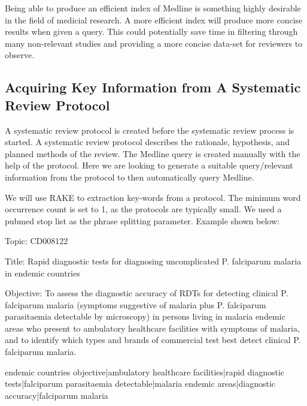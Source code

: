 Being able to produce an efficient index of Medline is something highly desirable in the field of medicial research. A more efficient index will produce more concise results when given a query. This could potentially save time in filtering through many non-relevant studies and providing a more concise data-set for reviewers to observe. 

\subsection{Acquiring Key Information from A Systematic Review Protocol}

A systematic review protocol is created before the systematic review process is started. A systematic review protocol describes the rationale, hypothesis, and planned methods of the review. The Medline query is created manually with the help of the protocol. Here we are looking to generate a suitable query/relevant information from the protocol to then automatically query Medline.

We will use RAKE \cite{rake} to extraction key-words from a protocol. The minimum word occurrence count is set to 1, as the protocols are typically small. We used a pubmed stop list as the phrase splitting parameter. Example shown below:

\begin{tcolorbox}

Topic: CD008122 

Title: Rapid diagnostic tests for diagnosing uncomplicated P. falciparum malaria in endemic countries 

Objective: To assess the diagnostic accuracy of RDTs for detecting clinical P. falciparum malaria (symptoms suggestive of malaria plus P. falciparum parasitaemia detectable by microscopy) in persons living in malaria endemic areas who present to ambulatory healthcare facilities with symptoms of malaria, and to identify which types and brands of commercial test best detect clinical P. falciparum malaria.

\end{tcolorbox}

 
\begin{tcolorbox}

endemic countries objective|ambulatory healthcare facilities|rapid diagnostic tests|falciparum parasitaemia detectable|malaria endemic areas|diagnostic accuracy|falciparum malaria

\end{tcolorbox}

